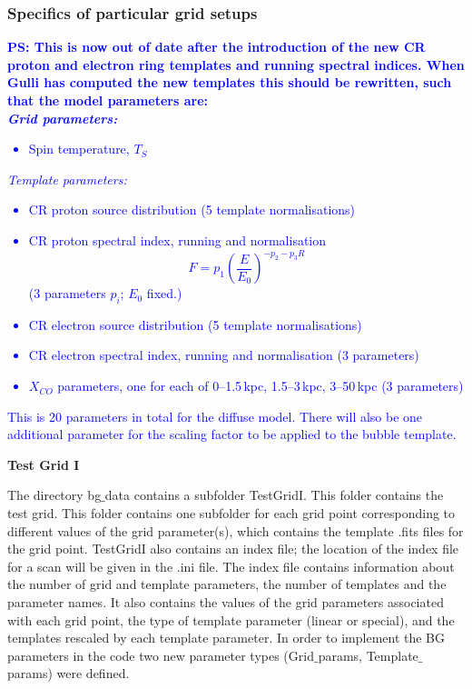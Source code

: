 \documentclass{article}
\newcommand{\ps}[1]{\textcolor{blue}{{\bf PS: #1}}}
\begin{document}
\subsubsection{Specifics of particular grid setups}

   \ps{This is now out of date after the introduction of the new CR proton and electron ring templates and running spectral indices.  When Gulli has computed the new templates this should be rewritten, such that the model parameters are:\vspace{3mm}\\{\em Grid parameters:}
   \begin{itemize}
      \item Spin temperature, $T_S$
   \end{itemize}
   {\em Template parameters:}
   \begin{itemize}
      \item CR proton source distribution (5 template normalisations)
      \item CR proton spectral index, running and normalisation \begin{displaymath}F = p_1 \left(\frac{E}{E_0}\right)^{-p_2 - p_3 R}\end{displaymath} (3 parameters $p_i$; $E_0$ fixed.)
      \item CR electron source distribution (5 template normalisations)
      \item CR electron spectral index, running and normalisation (3 parameters)
      \item $X_{CO}$ parameters, one for each of 0--1.5\,kpc, 1.5--3\,kpc, 3--50\,kpc (3 parameters)
   \end{itemize}
   This is 20 parameters in total for the diffuse model.  There will also be one additional parameter for the scaling factor to be applied to the bubble template.
   }

   {\bf Test Grid I }

   The directory bg$\_$data contains a subfolder TestGridI. This folder contains the test grid. This folder contains one subfolder for each grid point corresponding to different values of the grid parameter(s), which contains the template .fits files for the grid point. TestGridI also contains an index file; the location of the index file for a scan will be given in the .ini file. The index file contains information about the number of grid and template parameters, the number of templates and the parameter names. It also contains the values of the grid parameters associated with each grid point, the type of template parameter (linear or special), and the templates rescaled by each template parameter. In order to implement the BG parameters in the code two new parameter types (Grid$\_$params, Template$\_$params) were defined. \\
\end{document}
